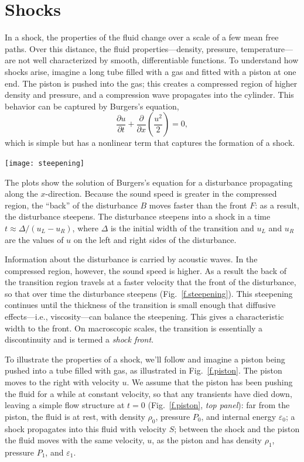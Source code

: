 \section{Shocks}
\newcommand{\gpo}{\ensuremath{(\gamma+1)}}
\newcommand{\gmo}{\ensuremath{(\gamma-1)}}

In a shock, the properties of the fluid change over a scale of a few mean free paths.  Over this distance, the fluid properties---density, pressure, temperature---are not well characterized by smooth, differentiable functions. To understand how shocks arise, imagine a long tube filled with a gas and fitted with a piston at one end. The piston is pushed into the gas; this creates a compressed region of higher density and pressure, and a compression wave propagates into the cylinder.  This behavior can be captured by Burgers's equation,
\[ \frac{\partial u}{\partial t} + \frac{\partial}{\partial x}\left(\frac{u^{2}}{2}\right) = 0, \]
which is simple but has a nonlinear term that captures the formation of a shock.

\begin{marginfigure}
\texttt{[image: steepening]}
\caption[A disturbance steepening as it propagates.]{The plots show the solution of Burgers's equation for a disturbance propagating along the $x$-direction.  Because the sound speed is greater in the compressed region, the ``back'' of the disturbance $B$ moves faster than the front $F$: as a result, the disturbance steepens.  The disturbance steepens into a shock in a time $t\approx \Delta/(u_{L}-u_{R})$, where $\Delta$ is the initial width of the transition and $u_{L}$ and $u_{R}$ are the values of $u$ on the left and right sides of the disturbance.  }
\label{f.steepening}
\end{marginfigure}

Information about the disturbance is carried by acoustic waves.  In the compressed region, however, the sound speed is higher.  As a result the back of the transition region travels at a faster velocity that the front of the disturbance, so that over time the disturbance steepens (Fig.~\ref{f.steepening}). This steepening continues until the thickness of the transition is small enough that diffusive effects---i.e., viscosity---can balance the steepening.  This gives a characteristic width to the front.  On macroscopic scales, the transition is essentially a discontinuity and is termed a \emph{shock front}.


To illustrate the properties of a shock, we'll follow  and imagine a piston being pushed into a tube filled with gas, as illustrated in Fig.~\ref{f.piston}.  The piston moves to the right with velocity $u$.  We assume that the piston has been pushing the fluid for a while at constant velocity, so that any transients have died down, leaving a simple flow structure at $t=0$ (Fig.~\ref{f.piston}, \emph{top panel}): far from the piston, the fluid is at rest, with density $\rho_{0}$, pressure $P_{0}$, and internal energy $\varepsilon_{0}$; a shock propagates into this fluid with velocity $S$; between the shock and the piston the fluid moves with the same velocity, $u$, as the piston and has density $\rho_{1}$, pressure $P_{1}$, and $\varepsilon_{1}$.


